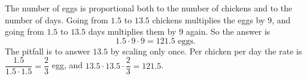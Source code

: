 The number of eggs is proportional both to the number of chickens and to the number of days. Going from $1.5$ to $13.5$ chickens multiplies the eggs by $9$, and going from $1.5$ to $13.5$ days multiplies them by $9$ again. So the answer is
\[
1.5\cdot9\cdot9=\boxed{121.5}\text{ eggs}.
\]
The pitfall is to answer $13.5$ by scaling only once. Per chicken per day the rate is $\dfrac{1.5}{1.5\cdot1.5}=\dfrac{2}{3}$ egg, and $13.5\cdot13.5\cdot\dfrac{2}{3}=121.5$.
